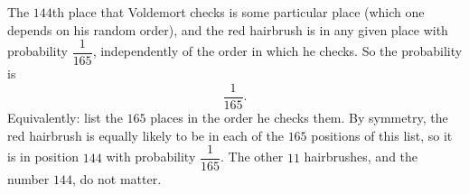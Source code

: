 The $144$th place that Voldemort checks is some particular place (which one depends on his random order), and the red hairbrush is in any given place with probability $\dfrac{1}{165}$, independently of the order in which he checks. So the probability is
\[\boxed{\dfrac{1}{165}}.\]
Equivalently: list the $165$ places in the order he checks them. By symmetry, the red hairbrush is equally likely to be in each of the $165$ positions of this list, so it is in position $144$ with probability $\dfrac{1}{165}$. The other $11$ hairbrushes, and the number $144$, do not matter.
